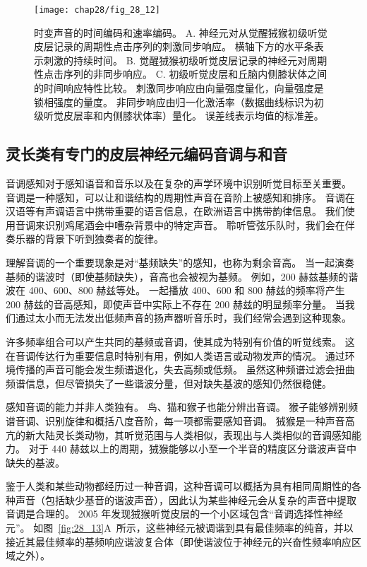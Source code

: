\begin{figure}[htbp]
	\centering
	\texttt{[image: chap28/fig\_28\_12]}
	\caption{时变声音的时间编码和速率编码。
	A. 神经元对从觉醒狨猴初级听觉皮层记录的周期性点击序列的刺激同步响应。
	横轴下方的水平条表示刺激的持续时间\cite{lu2001temporal}。
	B. 觉醒狨猴初级听觉皮层记录的神经元对周期性点击序列的非同步响应\cite{lu2001temporal}。
	C. 初级听觉皮层和丘脑内侧膝状体之间的时间响应特性比较。
	刺激同步响应由向量强度量化，向量强度是锁相强度的量度。
	非同步响应由归一化激活率（数据曲线标识为初级听觉皮层率和内侧膝状体率）量化。
	误差线表示均值的标准差\cite{bartlett2007neural}。}
	\label{fig:28_12}
\end{figure}



\subsection{灵长类有专门的皮层神经元编码音调与和音}

音调感知对于感知语音和音乐以及在复杂的声学环境中识别听觉目标至关重要。
音调是一种感知，可以让和谐结构的周期性声音在音阶上被感知和排序。
音调在汉语等有声调语言中携带重要的语言信息，在欧洲语言中携带韵律信息。
我们使用音调来识别鸡尾酒会中嘈杂背景中的特定声音。
聆听管弦乐队时，我们会在伴奏乐器的背景下听到独奏者的旋律。


理解音调的一个重要现象是对“基频缺失”的感知，也称为剩余音高。
当一起演奏基频的谐波时（即使基频缺失），音高也会被视为基频。
例如，200 赫兹基频的谐波在 400、600、800 赫兹等处。
一起播放 400、600 和 800 赫兹的频率将产生 200 赫兹的音高感知，即使声音中实际上不存在 200 赫兹的明显频率分量。
当我们通过太小而无法发出低频声音的扬声器听音乐时，我们经常会遇到这种现象。


许多频率组合可以产生共同的基频或音调，使其成为特别有价值的听觉线索。
这在音调传达行为重要信息时特别有用，例如人类语言或动物发声的情况。
通过环境传播的声音可能会发生频谱退化，失去高频或低频。
虽然这种频谱过滤会扭曲频谱信息，但尽管损失了一些谐波分量，但对缺失基波的感知仍然很稳健。


感知音调的能力并非人类独有。
鸟、猫和猴子也能分辨出音调。
猴子能够辨别频谱音调、识别旋律和概括八度音阶，每一项都需要感知音调。
狨猴是一种声音高亢的新大陆灵长类动物，其听觉范围与人类相似，表现出与人类相似的音调感知能力。
对于 440 赫兹以上的周期，狨猴能够以小至一个半音的精度区分谐波声音中缺失的基波。


鉴于人类和某些动物都经历过一种音调，这种音调可以概括为具有相同周期性的各种声音（包括缺少基音的谐波声音），因此认为某些神经元会从复杂的声音中提取音调是合理的。
2005 年发现狨猴听觉皮层的一个小区域包含“音调选择性神经元”\cite{bendor2005neuronal}。
如图~\ref{fig:28_13}A~所示，这些神经元被调谐到具有最佳频率的纯音，并以接近其最佳频率的基频响应谐波复合体（即使谐波位于神经元的兴奋性频率响应区域之外）。



